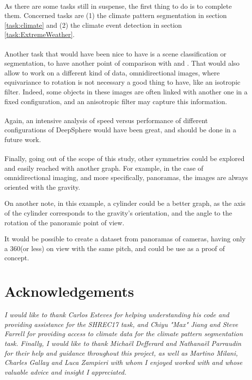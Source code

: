 \documentclass[11pt]{report}
\begin{document}
\paragraph*{}
As there are some tasks still in suspense, the first thing to do is to complete them. Concerned tasks are (1) the climate pattern segmentation in section \ref{task:climate} and (2) the climate event detection in section \ref{task:ExtremeWeather}.

\paragraph*{}
Another task that would have been nice to have is a scene classification or segmentation, to have another point of comparison with \cite{cohen_gauge_2019} and \cite{jiang_spherical_2019}. That would also allow to work on a different kind of data, omnidirectional images, where equivariance to rotation is not necessary a good thing to have, like an isotropic filter. Indeed, some objects in these images are often linked with another one in a fixed configuration, and an anisotropic filter may capture this information.

\paragraph*{}
Again, an intensive analysis of speed versus performance of different configurations of DeepSphere would have been great, and should be done in a future work.

\paragraph*{}
Finally, going out of the scope of this study, other symmetries could be explored and easily reached with another graph. For example, in the case of omnidirectional imaging, and more specifically, panoramas, the images are always oriented with the gravity. 

On another note, in this example, a cylinder could be a better graph, as the axis of the cylinder corresponds to the gravity's orientation, and the angle to the rotation of the panoramic point of view. %

It would be possible to create a dataset from panoramas of cameras, having only a 360\degree (or less) on view with the same pitch, and could be use as a proof of concept.


\section*{Acknowledgements}
\emph{I would like to thank Carlos Esteves for helping understanding his code and providing assistance for the SHREC17 task, and Chiyu "Max" Jiang and Steve Farrell for providing access to climate data for the climate pattern segmentation task.
Finally, I would like to thank Michaël Defferard and Nathanaël Parraudin for their help and guidance throughout this project, as well as Martino Milani, Charles Gallay and Luca Zampieri with whom I enjoyed worked with and whose valuable advice and insight I appreciated.}
\end{document}
